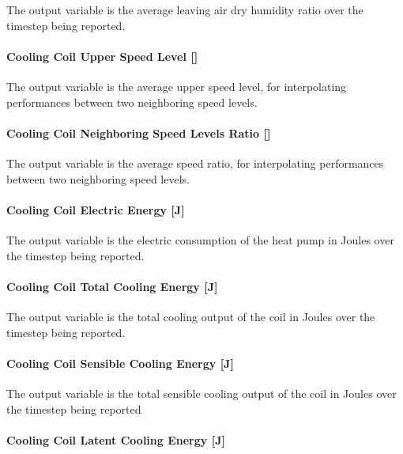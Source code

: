 The output variable is the average leaving air dry humidity ratio over the timestep being reported.

\paragraph{Cooling Coil Upper Speed Level {[]}}\label{cooling-coil-upper-speed-level}

The output variable is the average upper speed level, for interpolating performances between two neighboring speed levels.

\paragraph{Cooling Coil Neighboring Speed Levels Ratio {[]}}\label{cooling-coil-neighboring-speed-levels-ratio}

The output variable is the average speed ratio, for interpolating performances between two neighboring speed levels.

\paragraph{Cooling Coil Electric Energy {[}J{]}}\label{cooling-coil-electric-energy-j-1}

The output variable is the electric consumption of the heat pump in Joules over the timestep being reported.

\paragraph{Cooling Coil Total Cooling Energy {[}J{]}}\label{cooling-coil-total-cooling-energy-j-5}

The output variable is the total cooling output of the coil in Joules over the timestep being reported.

\paragraph{Cooling Coil Sensible Cooling Energy {[}J{]}}\label{cooling-coil-sensible-cooling-energy-j-5}

The output variable is the total sensible cooling output of the coil in Joules over the timestep being reported

\paragraph{Cooling Coil Latent Cooling Energy {[}J{]}}\label{cooling-coil-latent-cooling-energy-j-3}

